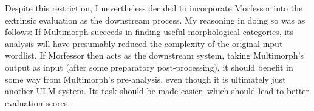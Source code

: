 {Despite this restriction, I nevertheless decided to incorporate Morfessor into the extrinsic evaluation as
the downstream process. My reasoning in doing so was as follows:
If Multimorph succeeds in finding useful morphological categories, its analysis will have presumably reduced the complexity of the original input wordlist. If Morfessor then acts as the downstream system, taking Multimorph's output as input (after some preparatory post-processing), it should benefit in some way from Multimorph's pre-analysis, even though it is ultimately just another ULM system. Its task should be made easier, which should lead to better evaluation scores.





}
